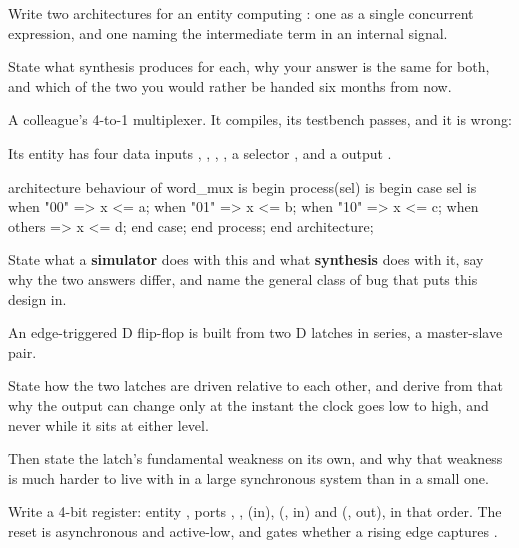  Write two architectures for an entity computing : one as a single
concurrent expression, and one naming the intermediate term  in an internal signal.

State what synthesis produces for each, why your answer is the same for both, and which of the two
you would rather be handed six months from now. 

 A colleague's 4-to-1 multiplexer. It compiles, its testbench passes, and it is wrong:

Its entity has four  data inputs , , , , a
 selector , and a  output .

\begin{vhdlcode}
architecture behaviour of word_mux is
begin
    process(sel) is
    begin
        case sel is
            when "00"   => x <= a;
            when "01"   => x <= b;
            when "10"   => x <= c;
            when others => x <= d;
        end case;
    end process;
end architecture;
\end{vhdlcode}

\noindent State what a \textbf{simulator} does with this and what \textbf{synthesis} does with it,
say why the two answers differ, and name the general class of bug that puts this design in.

\label{exb:q:3}

 An edge-triggered D flip-flop is built from two D latches in series, a master-slave pair.

State how the two latches are driven relative to each other, and derive from that why the output
can change only at the instant the clock goes low to high, and never while it sits at either level.

Then state the latch's fundamental weakness on its own, and why that weakness is much harder to
live with in a large synchronous system than in a small one. 

 Write a 4-bit register: entity , ports , ,
 (in),  (, in) and 
(, out), in that order. The reset is asynchronous and
active-low, and  gates whether a rising edge captures .

